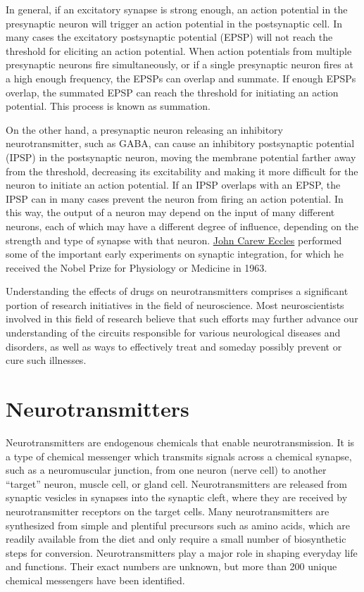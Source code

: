 In general, if an excitatory synapse is strong enough, an action potential in the presynaptic neuron will trigger an action potential in the postsynaptic cell. In many cases the excitatory postsynaptic potential (EPSP) will not reach the threshold for eliciting an action potential. When action potentials from multiple presynaptic neurons fire simultaneously, or if a single presynaptic neuron fires at a high enough frequency, the EPSPs can overlap and summate. If enough EPSPs overlap, the summated EPSP can reach the threshold for initiating an action potential. This process is known as summation.

On the other hand, a presynaptic neuron releasing an inhibitory neurotransmitter, such as GABA, can cause an inhibitory postsynaptic potential (IPSP) in the postsynaptic neuron, moving the membrane potential farther away from the threshold, decreasing its excitability and making it more difficult for the neuron to initiate an action potential. If an IPSP overlaps with an EPSP, the IPSP can in many cases prevent the neuron from firing an action potential. In this way, the output of a neuron may depend on the input of many different neurons, each of which may have a different degree of influence, depending on the strength and type of synapse with that neuron. \href{https://en.wikipedia.org/wiki/John_Eccles_(neurophysiologist)}{John Carew Eccles} performed some of the important early experiments on synaptic integration, for which he received the Nobel Prize for Physiology or Medicine in 1963.

Understanding the effects of drugs on neurotransmitters comprises a significant portion of research initiatives in the field of neuroscience. Most neuroscientists involved in this field of research believe that such efforts may further advance our understanding of the circuits responsible for various neurological diseases and disorders, as well as ways to effectively treat and someday possibly prevent or cure such illnesses.

\hypertarget{neurotransmitters}{%
\section{Neurotransmitters}\label{neurotransmitters}}

Neurotransmitters are endogenous chemicals that enable neurotransmission. It is a type of chemical messenger which transmits signals across a chemical synapse, such as a neuromuscular junction, from one neuron (nerve cell) to another ``target'' neuron, muscle cell, or gland cell. Neurotransmitters are released from synaptic vesicles in synapses into the synaptic cleft, where they are received by neurotransmitter receptors on the target cells. Many neurotransmitters are synthesized from simple and plentiful precursors such as amino acids, which are readily available from the diet and only require a small number of biosynthetic steps for conversion. Neurotransmitters play a major role in shaping everyday life and functions. Their exact numbers are unknown, but more than 200 unique chemical messengers have been identified.

